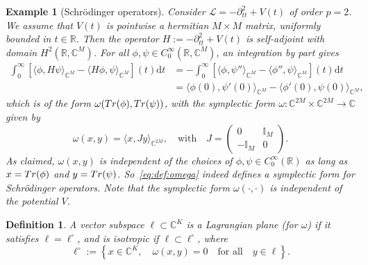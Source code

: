 \documentclass[11pt]{amsart}
\numberwithin{equation}{section} %
\newtheorem{definition}[theorem]{Definition}
\newtheorem{example}[theorem]{Example}
\newcommand\1{{\mathds 1}}
\def\C{{\mathbb C}}
\def\bbI{{\mathbb I}}
\def\R{{\mathbb R}}
\def\rd{{\mathrm{d}}}
\def\cL{{\mathcal L}}
\def\bra{\langle}
\def\ket{\rangle}
\def\Tr{{\rm Tr}}
\begin{document}
\begin{example}[Schrödinger operators] \label{ex:schrodinger}
Consider $\cL = - \partial_{tt}^2 + V(t)$ of order $p = 2$. We assume that $V(t)$ is pointwise a hermitian $M \times M$ matrix, uniformly bounded in $t \in \R$. Then the operator $H := - \partial_{tt}^2 + V(t)$ is self-adjoint with domain $H^2(\R, \C^M)$.  For all $\phi, \psi \in C^\infty_0(\R, \C^M)$, an integration by part gives
\begin{align*}
    \int_0^\infty \left[ \bra \phi, H \psi \ket_{\C^M} - \bra H \phi, \psi \ket_{\C^M} \right](t) \rd t & = -\int_0^\infty \left[ \bra \phi, \psi'' \ket_{\C^M} - \bra \phi'', \psi \ket_{\C^M} \right](t) \rd t  \\
    & = \bra \phi(0), \psi'(0) \ket_{\C^M} -  \bra \phi'(0), \psi(0) \ket_{\C^M} ,
\end{align*}
which is of the form $\omega(\Tr(\phi), \Tr(\psi))$, with the symplectic form $\omega : \C^{2M} \times \C^{2M} \to \C$ given by
\begin{equation}\label{eq:exmp_schrodinger_omega}
	\omega(x, y) = \bra x, J y \ket_{\C^{2M}}, \quad \text{with} \quad 
	J = \begin{pmatrix}
		0 & \bbI_M \\ - \bbI_M & 0    
	\end{pmatrix}.
\end{equation}
As claimed, $\omega(x, y)$ is independent of the choices of $\phi, \psi \in C^\infty_0(\R)$ as long as $x = \Tr(\phi)$ and $y = \Tr(\psi)$. So~\eqref{eq:def:omega} indeed defines a symplectic form for Schrödinger operators. Note that the symplectic form $\omega(\cdot, \cdot)$ is independent of the potential $V$. 
\end{example}


\begin{definition}
	A vector subspace $\ell \subset \C^K$ is a {\em Lagrangian plane} (for $\omega$) if it satisfies $\ell = \ell^\circ$, and is {\em isotropic} if $\ell \subset \ell^\circ$, where
	\begin{equation} \label{eq:def:Lagrangian_planes}
		\ell^\circ := \left\{ x \in \C^K, \quad \omega(x,y) = 0 \quad \text{for all} \quad y \in \ell \right\}.
	\end{equation}
\end{definition}
\end{document}
